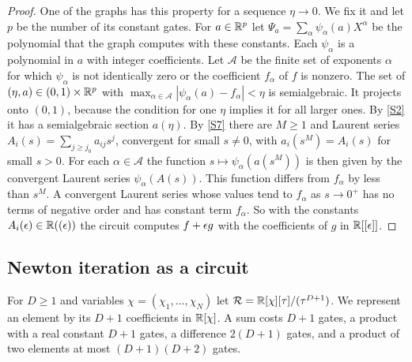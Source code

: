 \begin{proof}
One of the graphs has this property for a sequence $\eta\to0$. We fix it and let $p$ be the number of its constant gates. For $a\in\mathbb{R}^p$ let $\Psi_a=\sum_\alpha\psi_\alpha(a)X^\alpha$ be the polynomial that the graph computes with these constants. Each $\psi_\alpha$ is a polynomial in $a$ with integer coefficients. Let $\mathcal A$ be the finite set of exponents $\alpha$ for which $\psi_\alpha$ is not identically zero or the coefficient $f_\alpha$ of $f$ is nonzero. The set of $(\eta,a)\in(0,1)\times\mathbb{R}^p$ with $\max_{\alpha\in\mathcal A}|\psi_\alpha(a)-f_\alpha|<\eta$ is semialgebraic. It projects onto $(0,1)$, because the condition for one $\eta$ implies it for all larger ones. By \ref{S2} it has a semialgebraic section $a(\eta)$. By \ref{S7} there are $M\ge1$ and Laurent series $A_i(s)=\sum_{j\ge j_0}a_{ij}s^j$, convergent for small $s\ne0$, with $a_i(s^M)=A_i(s)$ for small $s>0$. For each $\alpha\in\mathcal A$ the function $s\mapsto\psi_\alpha(a(s^M))$ is then given by the convergent Laurent series $\psi_\alpha(A(s))$. This function differs from $f_\alpha$ by less than $s^M$. A convergent Laurent series whose values tend to $f_\alpha$ as $s\to0^+$ has no terms of negative order and has constant term $f_\alpha$. So with the constants $A_i(\epsilon)\in\mathbb{R}((\epsilon))$ the circuit computes $f+\epsilon g$ with the coefficients of $g$ in $\mathbb{R}[[\epsilon]]$.
\end{proof}

\subsection{Newton iteration as a circuit}

For $D\ge1$ and variables $\chi=(\chi_1,\dots,\chi_N)$ let $\mathcal{R}=\mathbb{R}[\chi][\tau]/(\tau^{D+1})$. We represent an element by its $D+1$ coefficients in $\mathbb{R}[\chi]$. A sum costs $D+1$ gates, a product with a real constant $D+1$ gates, a difference $2(D+1)$ gates, and a product of two elements at most $(D+1)(D+2)$ gates.

